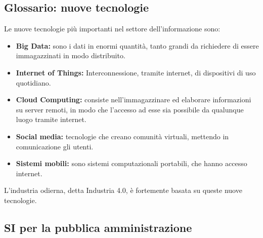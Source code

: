 \documentclass[\main/main.tex]{subfiles}
\begin{document}
\subsection{Glossario: nuove tecnologie}
Le nuove tecnologie più importanti nel settore dell'informazione sono:
\begin{itemize}
  \item \textbf{Big Data:} sono i dati in enormi quantità, tanto grandi da richiedere di essere immagazzinati in modo distribuito.
  \item \textbf{Internet of Things:} Interconnessione, tramite internet, di dispositivi di uso quotidiano.
  \item \textbf{Cloud Computing:} consiste nell'immagazzinare ed elaborare informazioni su server remoti, in modo che l'accesso ad esse sia possibile da qualunque luogo tramite internet.
  \item \textbf{Social media:} tecnologie che creano comunità virtuali, mettendo in comunicazione gli utenti.
  \item \textbf{Sistemi mobili:} sono sistemi computazionali portabili, che hanno accesso internet.
\end{itemize}
L'industria odierna, detta Industria 4.0, è fortemente basata su queste nuove tecnologie.

\subsection{SI per la pubblica amministrazione}
\end{document}
